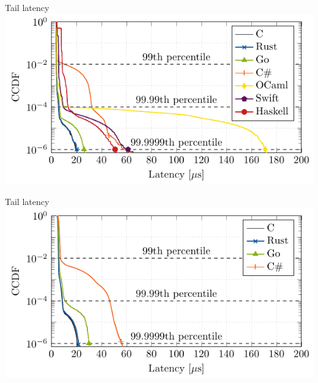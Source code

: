 \documentclass[NET,english,aspectratio=169,notitleframe]{tumbeamer}
\begin{document}
%
%
%
%

\begin{frame}{Tail latency}
\centering\includegraphics[scale=1.1]{figures/latency-1/latency-ccdf.pdf}
\end{frame}

\begin{frame}{Tail latency}
\centering\includegraphics[scale=1.1]{figures/latency-10/latency-ccdf.pdf}
\end{frame}
\end{document}

